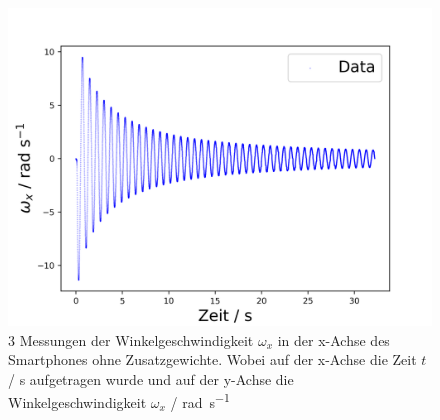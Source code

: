 \documentclass[11pt,ngerman]{scrartcl}
\begin{document}
\begin{figure}[H]
\begin{minipage}[htbp]{\linewidth}
\begin{minipage}[htbp]{.32\linewidth}
            \includegraphics[width=\linewidth]{pics/omega/fit_of_t_wx_mess_nr_3.png}
        \end{minipage}
        \caption[Schwingungsmessungen ohne Zusatzgewichte]{3 Messungen der Winkelgeschwindigkeit $\omega_{x}$ in der x-Achse des Smartphones ohne Zusatzgewichte.
        Wobei auf der x-Achse die Zeit $t$ / \si{\second} aufgetragen wurde und auf der y-Achse die Winkelgeschwindigkeit $\omega_x$ / \si{\radian\per\second} }
        \label{fig:ohne}
    \end{minipage}
 \end{figure}

\newpage
\end{document}
